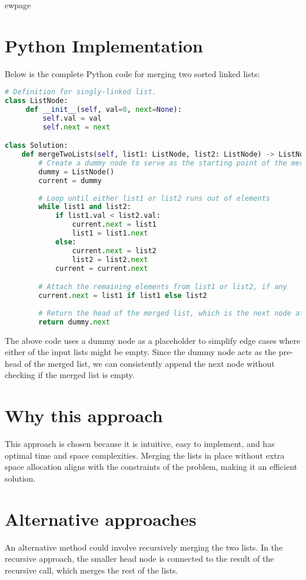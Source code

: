 ewpage %
\section*{Python Implementation}
Below is the complete Python code for merging two sorted linked lists:

\begin{fullwidth}
\begin{lstlisting}[language=Python]
# Definition for singly-linked list.
class ListNode:
     def __init__(self, val=0, next=None):
         self.val = val
         self.next = next

class Solution:
    def mergeTwoLists(self, list1: ListNode, list2: ListNode) -> ListNode:
        # Create a dummy node to serve as the starting point of the merged list
        dummy = ListNode()
        current = dummy
        
        # Loop until either list1 or list2 runs out of elements
        while list1 and list2:
            if list1.val < list2.val:
                current.next = list1
                list1 = list1.next
            else:
                current.next = list2
                list2 = list2.next
            current = current.next

        # Attach the remaining elements from list1 or list2, if any
        current.next = list1 if list1 else list2
        
        # Return the head of the merged list, which is the next node after dummy
        return dummy.next
\end{lstlisting}

\end{fullwidth}

The above code uses a dummy node as a placeholder to simplify edge cases where either of the input lists might be empty. Since the dummy node acts as the pre-head of the merged list, we can consistently append the next node without checking if the merged list is empty.

\section*{Why this approach}
This approach is chosen because it is intuitive, easy to implement, and has optimal time and space complexities. Merging the lists in place without extra space allocation aligns with the constraints of the problem, making it an efficient solution.

\section*{Alternative approaches}
An alternative method could involve recursively merging the two lists. In the recursive approach, the smaller head node is connected to the result of the recursive call, which merges the rest of the lists.

